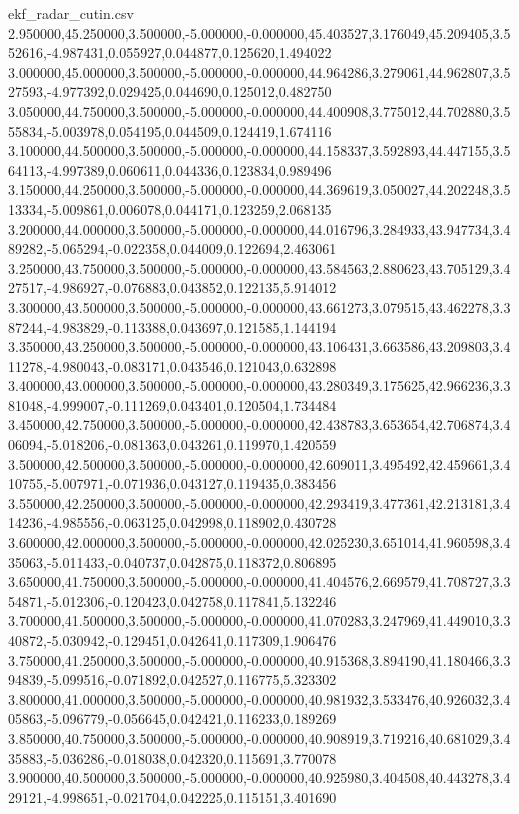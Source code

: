 \begin{filecontents*}[overwrite]{ekf_radar_cutin.csv}
2.950000,45.250000,3.500000,-5.000000,-0.000000,45.403527,3.176049,45.209405,3.552616,-4.987431,0.055927,0.044877,0.125620,1.494022
3.000000,45.000000,3.500000,-5.000000,-0.000000,44.964286,3.279061,44.962807,3.527593,-4.977392,0.029425,0.044690,0.125012,0.482750
3.050000,44.750000,3.500000,-5.000000,-0.000000,44.400908,3.775012,44.702880,3.555834,-5.003978,0.054195,0.044509,0.124419,1.674116
3.100000,44.500000,3.500000,-5.000000,-0.000000,44.158337,3.592893,44.447155,3.564113,-4.997389,0.060611,0.044336,0.123834,0.989496
3.150000,44.250000,3.500000,-5.000000,-0.000000,44.369619,3.050027,44.202248,3.513334,-5.009861,0.006078,0.044171,0.123259,2.068135
3.200000,44.000000,3.500000,-5.000000,-0.000000,44.016796,3.284933,43.947734,3.489282,-5.065294,-0.022358,0.044009,0.122694,2.463061
3.250000,43.750000,3.500000,-5.000000,-0.000000,43.584563,2.880623,43.705129,3.427517,-4.986927,-0.076883,0.043852,0.122135,5.914012
3.300000,43.500000,3.500000,-5.000000,-0.000000,43.661273,3.079515,43.462278,3.387244,-4.983829,-0.113388,0.043697,0.121585,1.144194
3.350000,43.250000,3.500000,-5.000000,-0.000000,43.106431,3.663586,43.209803,3.411278,-4.980043,-0.083171,0.043546,0.121043,0.632898
3.400000,43.000000,3.500000,-5.000000,-0.000000,43.280349,3.175625,42.966236,3.381048,-4.999007,-0.111269,0.043401,0.120504,1.734484
3.450000,42.750000,3.500000,-5.000000,-0.000000,42.438783,3.653654,42.706874,3.406094,-5.018206,-0.081363,0.043261,0.119970,1.420559
3.500000,42.500000,3.500000,-5.000000,-0.000000,42.609011,3.495492,42.459661,3.410755,-5.007971,-0.071936,0.043127,0.119435,0.383456
3.550000,42.250000,3.500000,-5.000000,-0.000000,42.293419,3.477361,42.213181,3.414236,-4.985556,-0.063125,0.042998,0.118902,0.430728
3.600000,42.000000,3.500000,-5.000000,-0.000000,42.025230,3.651014,41.960598,3.435063,-5.011433,-0.040737,0.042875,0.118372,0.806895
3.650000,41.750000,3.500000,-5.000000,-0.000000,41.404576,2.669579,41.708727,3.354871,-5.012306,-0.120423,0.042758,0.117841,5.132246
3.700000,41.500000,3.500000,-5.000000,-0.000000,41.070283,3.247969,41.449010,3.340872,-5.030942,-0.129451,0.042641,0.117309,1.906476
3.750000,41.250000,3.500000,-5.000000,-0.000000,40.915368,3.894190,41.180466,3.394839,-5.099516,-0.071892,0.042527,0.116775,5.323302
3.800000,41.000000,3.500000,-5.000000,-0.000000,40.981932,3.533476,40.926032,3.405863,-5.096779,-0.056645,0.042421,0.116233,0.189269
3.850000,40.750000,3.500000,-5.000000,-0.000000,40.908919,3.719216,40.681029,3.435883,-5.036286,-0.018038,0.042320,0.115691,3.770078
3.900000,40.500000,3.500000,-5.000000,-0.000000,40.925980,3.404508,40.443278,3.429121,-4.998651,-0.021704,0.042225,0.115151,3.401690

\end{filecontents*}
